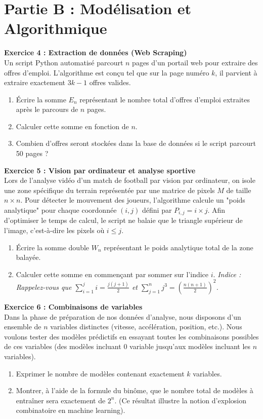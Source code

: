 \documentclass[12pt,a4paper]{report}
\begin{document}
\vspace{1cm}

\section*{Partie B : Modélisation et Algorithmique}

\textbf{Exercice 4 : Extraction de données (Web Scraping)} \\
Un script Python automatisé parcourt $n$ pages d'un portail web pour extraire des offres d'emploi. L'algorithme est conçu tel que sur la page numéro $k$, il parvient à extraire exactement $3k - 1$ offres valides.
\begin{enumerate}
    \item Écrire la somme $E_n$ représentant le nombre total d'offres d'emploi extraites après le parcours de $n$ pages.
    \item Calculer cette somme en fonction de $n$.
    \item Combien d'offres seront stockées dans la base de données si le script parcourt 50 pages ?
\end{enumerate}

\textbf{Exercice 5 : Vision par ordinateur et analyse sportive} \\
Lors de l'analyse vidéo d'un match de football par vision par ordinateur, on isole une zone spécifique du terrain représentée par une matrice de pixels $M$ de taille $n \times n$. Pour détecter le mouvement des joueurs, l'algorithme calcule un "poids analytique" pour chaque coordonnée $(i,j)$ défini par $P_{i,j} = i \times j$. 
Afin d'optimiser le temps de calcul, le script ne balaie que le triangle supérieur de l'image, c'est-à-dire les pixels où $i \le j$.
\begin{enumerate}
    \item Écrire la somme double $W_n$ représentant le poids analytique total de la zone balayée.
    \item Calculer cette somme en commençant par sommer sur l'indice $i$. 
    \textit{Indice : Rappelez-vous que $\sum_{i=1}^{j} i = \frac{j(j+1)}{2}$ et $\sum_{j=1}^{n} j^3 = \left(\frac{n(n+1)}{2}\right)^2$.}
\end{enumerate}

\textbf{Exercice 6 : Combinaisons de variables} \\
Dans la phase de préparation de nos données d'analyse, nous disposons d'un ensemble de $n$ variables distinctes (vitesse, accélération, position, etc.). Nous voulons tester des modèles prédictifs en essayant toutes les combinaisons possibles de ces variables (des modèles incluant $0$ variable jusqu'aux modèles incluant les $n$ variables).
\begin{enumerate}
    \item Exprimer le nombre de modèles contenant exactement $k$ variables.
    \item Montrer, à l'aide de la formule du binôme, que le nombre total de modèles à entraîner sera exactement de $2^n$. (Ce résultat illustre la notion d'explosion combinatoire en machine learning).
\end{enumerate}
\end{document}
